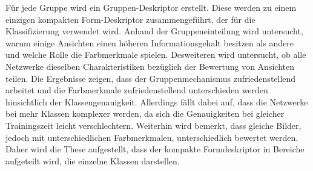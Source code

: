 \documentclass[a4paper,            	%
               12pt,               	%
               chapterprefix,      	%
               appendixprefix,		%
               headsepline,        	%
               twoside,				%
               draft=false]         %
               {scrbook}			%
\theoremstyle{defstyle}
\theoremstyle{bspstyle}
\begin{document}
\begin{BaMaAbstract}
{	Für jede Gruppe wird ein Gruppen-Deskriptor erstellt.
	Diese werden zu einem einzigen kompakten Form-Deskriptor zusammengeführt, der für die Klassifizierung verwendet wird.
	Anhand der Gruppeneinteilung wird untersucht, warum einige Ansichten einen höheren Informationsgehalt besitzen als andere und welche Rolle die Farbmerkmale spielen.
	Desweiteren wird untersucht, ob alle Netzwerke dieselben Charakteristiken bezüglich der Bewertung von Ansichten teilen.
	Die Ergebnisse zeigen, dass der Gruppenmechanismus zufriedenstellend arbeitet und die Farbmerkmale zufriedenstellend unterschieden werden hinsichtlich der Klassengenauigkeit.
	Allerdings fällt dabei auf, dass die Netzwerke bei mehr Klassen komplexer werden, da sich die Genauigkeiten bei gleicher Trainingszeit leicht verschlechtern.
	Weiterhin wird bemerkt, dass gleiche Bilder, jedoch mit unterschiedlichen Farbmerkmalen, unterschiedlich bewertet werden.
	Daher wird die These aufgestellt, dass der kompakte Formdeskriptor in Bereiche aufgeteilt wird, die einzelne Klassen darstellen.
}
\end{BaMaAbstract}

\setcounter{secnumdepth}{2} %
\tableofcontents		%
\listoffigures			%
\listoftables			%
 
\markboth{\nomname}{\nomname}  %
\printnomenclature     %

 
\mainmatter				%









\backmatter			%

\begingroup
\raggedright\sloppy
\endgroup

\end{document}
